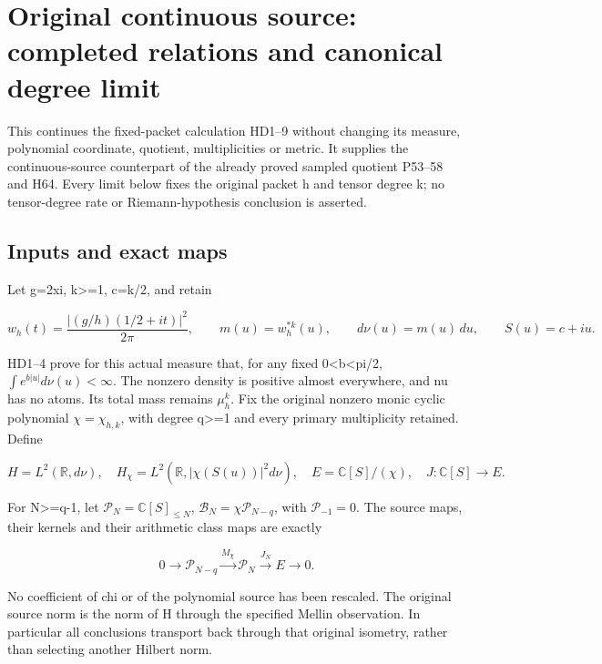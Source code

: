 \section{Original continuous source: completed relations and canonical degree limit}\label{original-continuous-source-completed-relations-and-canonical-degree-limit}

This continues the fixed-packet calculation HD1--9 without changing its measure, polynomial coordinate, quotient, multiplicities or metric. It supplies the continuous-source counterpart of the already proved sampled quotient P53--58 and H64. Every limit below fixes the original packet h and tensor degree k; no tensor-degree rate or Riemann-hypothesis conclusion is asserted.

\subsection{Inputs and exact maps}\label{inputs-and-exact-maps}

Let g=2xi, k\textgreater=1, c=k/2, and retain

\[
w_h(t)=\frac{|(g/h)(1/2+it)|^2}{2\pi},\qquad
m(u)=w_h^{*k}(u),\qquad d\nu(u)=m(u)\,du,\qquad S(u)=c+iu.
\tag{CR1}
\]

HD1--4 prove for this actual measure that, for any fixed 0\textless b\textless pi/2, \(\int e^{b|u|}d\nu(u)<\infty\). The nonzero density is positive almost everywhere, and nu has no atoms. Its total mass remains \(\mu_h^k\). Fix the original nonzero monic cyclic polynomial \(\chi=\chi_{h,k}\), with degree q\textgreater=1 and every primary multiplicity retained. Define

\[
H=L^2(\mathbb R,d\nu),\quad H_\chi=L^2(\mathbb R,|\chi(S(u))|^2d\nu),
\quad E=\mathbb C[S]/(\chi),\quad J:\mathbb C[S]\longrightarrow E.
\tag{CR2}
\]

For N\textgreater=q-1, let \(\mathcal P_N=\mathbb C[S]_{\le N}\), \(\mathcal B_N=\chi\mathcal P_{N-q}\), with \(\mathcal P_{-1}=0\). The source maps, their kernels and their arithmetic class maps are exactly

\[
0\longrightarrow\mathcal P_{N-q}\xrightarrow{M_\chi}
\mathcal P_N\xrightarrow{J_N}E\longrightarrow0.
\tag{CR3}
\]

No coefficient of chi or of the polynomial source has been rescaled. The original source norm is the norm of H through the specified Mellin observation. In particular all conclusions transport back through that original isometry, rather than selecting another Hilbert norm.

